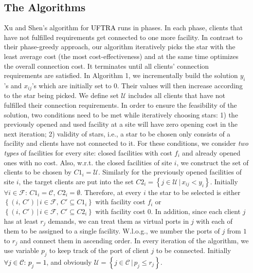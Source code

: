 \documentclass[10pt]{llncs}
\begin{document}
\subsection{The Algorithms}

Xu and Shen's algorithm \cite{shihongftfa} for \textcolor{black}{UFTRA}
runs in phases. In each phase, clients that have not fulfilled requirements
get connected to one more facility. In contrast to their phase-greedy
approach, our algorithm iteratively picks the star with the least
average cost (the most cost-effectiveness) and at the same time optimizes
the overall connection cost. It terminates until all clients' connection
requirements are satisfied. In Algorithm 1, we incrementally build
the solution $y_{i}$'s and $x_{ij}$'s which are initially set to
$0$. Their values will then increase according to the star being
picked. We define set $\mathcal{U}$ includes all clients that have
not fulfilled their connection requirements. In order to ensure the
feasibility of the solution, two conditions need to be met while iteratively
choosing stars: 1) the previously opened and used facility at a site
will have zero opening cost in the next iteration; 2) validity of
stars, i.e., a star to be chosen only consists of a facility and clients
have not connected to it. For these conditions, we consider \textit{two
types} of facilities for every site: closed facilities with cost $f_{i}$
and already opened ones with no cost. Also, w.r.t. the closed facilities
of site $i$, we construct the set of clients to be chosen by $C1_{i}=\mathcal{\mathcal{U}}$.
Similarly for the previously opened facilities of site $i$, the target
clients are put into the set $C2_{i}=\left\{ j\in\mathcal{\mathcal{U}}\,|\, x_{ij}<y_{i}\right\} $.
Initially $\forall i\in\mathcal{F}:\, C1_{i}=\mathcal{C}$, $C2_{i}=\emptyset$.
Therefore, at every $i$ the star to be selected is either $\left\{ \left(i,\, C'\right)\,|\, i\in\mathcal{F},\, C'\subseteq C1_{i}\right\} $
with facility cost $f_{i}$ or $\left\{ \left(i,\, C'\right)\,|\, i\in\mathcal{F},\, C'\subseteq C2_{i}\right\} $
with facility cost $0$. In addition, since each client $j$ has at
least $r_{j}$ demands, we can treat them as virtual ports in $j$
with each of them to be assigned to a single facility. W.l.o.g., we
number the ports of $j$ from $1$ to $r_{j}$ and connect them in
ascending order. In every iteration of the algorithm, we use variable
$p_{j}$ to keep track of the port of client $j$ to be connected.
Initially\textcolor{black}{{} $\forall j\in\mathcal{C}:\, p_{j}=1$},
and obviously $\mathcal{U}=\left\{ j\in\mathcal{C}\,|\, p_{j}\leq r_{j}\right\} $.
\end{document}
